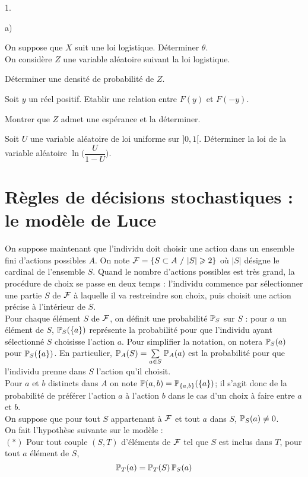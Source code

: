 \documentclass[11pt]{article}%
\begin{document}
\begin{noliste}{1.}
\begin{noliste}{a)}
  \item \label{niv_stimulus} On suppose que $X$ suit une loi 
  logistique. Déterminer $\theta$.\\[.2cm]
  On considère $Z$ une variable aléatoire suivant la loi logistique.
  
  \item Déterminer une densité de probabilité de $Z$.
  
  \item Soit $y$ un réel positif. Etablir une relation entre 
  $F(y)$ et $F(-y)$.
  
  \item Montrer que $Z$ admet une espérance et la déterminer.
  
  \item Soit $U$ une variable aléatoire de loi uniforme sur 
  $]0,1[$. Déterminer la loi de la variable aléatoire $\ln \Big( 
  \dfrac{U}{1-U} \Big)$.
 \end{noliste}
\end{noliste}








\section{Règles de décisions stochastiques : le modèle de Luce}

\noindent
On suppose maintenant que l'individu doit choisir une action dans un 
ensemble fini d'actions possibles $A$. On note ${\cal F} =\{ S\subset 
A \ / \ \vert S \vert \geq 2 \}$ où $\vert S \vert$ désigne le cardinal 
de l'ensemble $S$. Quand le nombre d'actions possibles est très grand, 
la procédure de choix se passe en deux temps : l'individu commence par 
sélectionner une partie $S$ de ${\cal F}$ à laquelle il va restreindre 
son choix, puis choisit une action précise à l'intérieur de $S$.\\[.1cm]
Pour chaque élément $S$ de ${\cal F}$, on définit une probabilité 
$\Prob_S$ sur $S$ : pour $a$ un élément de  $S$, $\Prob_S(\{ a\})$ 
représente la probabilité pour que l'individu ayant sélectionné 
$S$ choisisse l'action $a$. Pour simplifier la notation, on notera 
$\Prob_S(a)$ pour $\Prob_S(\{ a\} )$.  En particulier, 
$\Prob_A(S)= \Sum{a\in S}{} \Prob_A(a)$ est la probabilité pour 
que l'individu prenne dans $S$ l'action qu'il choisit.\\[.1cm]
Pour $a$ et $b$ distincts dans $A$ on note $\Prob(a,b) = \Prob_{\{ 
a,b\} }(\{ a\} )$; il s'agit donc de la probabilité de préférer l'action 
$a$ à l'action $b$ dans le cas d'un choix à faire entre $a$ et 
$b$.\\[.1cm]
On suppose que pour tout $S$ appartenant à ${\cal F}$ et tout $a$ dans 
$S$, $\Prob_S(a)\neq 0$.\\[.1cm]
On fait l'hypothèse suivante sur le modèle : \\[.1cm]
$(*)$ \qquad Pour tout couple $(S,T)$ d'éléments de ${\cal F}$ tel 
que $S$ est inclus dans $T$, pour tout $a$ élément de $S$, 
\[
 \Prob_T(a)=\Prob_T(S) \, \Prob_S(a)
\]
\end{document}
